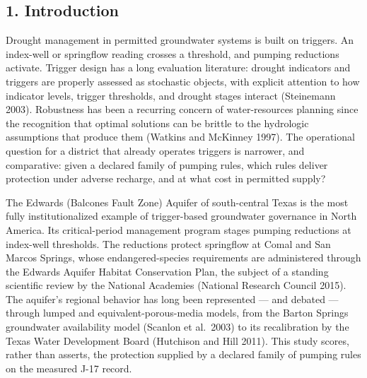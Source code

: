\documentclass[11pt]{article}
\begin{document}
\subsection{1. Introduction}\label{edw-introduction}

Drought management in permitted groundwater systems is built on
triggers. An index-well or springflow reading crosses a threshold, and
pumping reductions activate. Trigger design has a long evaluation
literature: drought indicators and triggers are properly assessed as
stochastic objects, with explicit attention to how indicator levels,
trigger thresholds, and drought stages interact (Steinemann 2003).
Robustness has been a recurring concern of water-resources planning
since the recognition that optimal solutions can be brittle to the
hydrologic assumptions that produce them (Watkins and McKinney 1997).
The operational question for a district that already operates triggers
is narrower, and comparative: given a declared family of pumping rules,
which rules deliver protection under adverse recharge, and at what cost
in permitted supply?

The Edwards (Balcones Fault Zone) Aquifer of south-central Texas is the
most fully institutionalized example of trigger-based groundwater
governance in North America. Its critical-period management program
stages pumping reductions at index-well thresholds. The reductions
protect springflow at Comal and San Marcos Springs, whose
endangered-species requirements are administered through the Edwards
Aquifer Habitat Conservation Plan, the subject of a standing scientific
review by the National Academies (National Research Council 2015). The
aquifer's regional behavior has long been represented --- and debated
--- through lumped and equivalent-porous-media models, from the Barton
Springs groundwater availability model (Scanlon et al.~2003) to its
recalibration by the Texas Water Development Board (Hutchison and Hill
2011). This study scores, rather than asserts, the protection supplied
by a declared family of pumping rules on the measured J-17 record.
\end{document}
